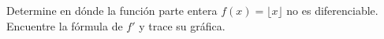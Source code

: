 \item Determine en dónde la función parte entera $f(x) = \lfloor x \rfloor$ no es diferenciable. Encuentre la fórmula de $f'$ y trace su gráfica.

